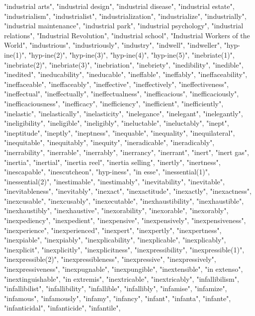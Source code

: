"industrial arts",
"industrial design",
"industrial disease",
"industrial estate",
"industrialism",
"industrialist",
"industrialization",
"industrialize",
"industrially",
"industrial maintenance",
"industrial park",
"industrial psychology",
"industrial relations",
"Industrial Revolution",
"industrial school",
"Industrial Workers of the World",
"industrious",
"industriously",
"industry",
"indwell",
"indweller",
"hyp-ine(1)",
"hyp-ine(2)",
"hyp-ine(3)",
"hyp-ine(4)",
"hyp-ine(5)",
"inebriate(1)",
"inebriate(2)",
"inebriate(3)",
"inebriation",
"inebriety",
"inedibility",
"inedible",
"inedited",
"ineducability",
"ineducable",
"ineffable",
"ineffably",
"ineffaceability",
"ineffaceable",
"ineffaceably",
"ineffective",
"ineffectively",
"ineffectiveness",
"ineffectual",
"ineffectually",
"ineffectualness",
"inefficacious",
"inefficaciously",
"inefficaciousness",
"inefficacy",
"inefficiency",
"inefficient",
"inefficiently",
"inelastic",
"inelastically",
"inelasticity",
"inelegance",
"inelegant",
"inelegantly",
"ineligibility",
"ineligible",
"ineligibly",
"ineluctable",
"ineluctably",
"inept",
"ineptitude",
"ineptly",
"ineptness",
"inequable",
"inequality",
"inequilateral",
"inequitable",
"inequitably",
"inequity",
"ineradicable",
"ineradicably",
"inerrability",
"inerrable",
"inerrably",
"inerrancy",
"inerrant",
"inert",
"inert gas",
"inertia",
"inertial",
"inertia reel",
"inertia selling",
"inertly",
"inertness",
"inescapable",
"inescutcheon",
"hyp-iness",
"in esse",
"inessential(1)",
"inessential(2)",
"inestimable",
"inestimably",
"inevitability",
"inevitable",
"inevitableness",
"inevitably",
"inexact",
"inexactitude",
"inexactly",
"inexactness",
"inexcusable",
"inexcusably",
"inexecutable",
"inexhaustibility",
"inexhaustible",
"inexhaustibly",
"inexhaustive",
"inexorability",
"inexorable",
"inexorably",
"inexpediency",
"inexpedient",
"inexpensive",
"inexpensively",
"inexpensiveness",
"inexperience",
"inexperienced",
"inexpert",
"inexpertly",
"inexpertness",
"inexpiable",
"inexpiably",
"inexplicability",
"inexplicable",
"inexplicably",
"inexplicit",
"inexplicitly",
"inexplicitness",
"inexpressibility",
"inexpressible(1)",
"inexpressible(2)",
"inexpressibleness",
"inexpressive",
"inexpressively",
"inexpressiveness",
"inexpugnable",
"inexpungible",
"inextensible",
"in extenso",
"inextinguishable",
"in extremis",
"inextricable",
"inextricably",
"infallibilism",
"infallibilist",
"infallibility",
"infallible",
"infallibly",
"infamise",
"infamize",
"infamous",
"infamously",
"infamy",
"infancy",
"infant",
"infanta",
"infante",
"infanticidal",
"infanticide",
"infantile",
